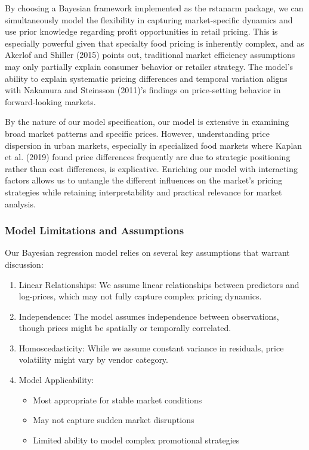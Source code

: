 \documentclass[
  letterpaper,
  DIV=11,
  numbers=noendperiod]{scrartcl}
\providecommand{\tightlist}{%
  \setlength{\itemsep}{0pt}\setlength{\parskip}{0pt}}\usepackage{longtable,booktabs,array}
\begin{document}
By choosing a Bayesian framework implemented as the rstanarm package, we
can simultaneously model the flexibility in capturing market-specific
dynamics and use prior knowledge regarding profit opportunities in
retail pricing. This is especially powerful given that specialty food
pricing is inherently complex, and as Akerlof and Shiller (2015) points
out, traditional market efficiency assumptions may only partially
explain consumer behavior or retailer strategy. The model's ability to
explain systematic pricing differences and temporal variation aligns
with Nakamura and Steinsson (2011)'s findings on price-setting behavior
in forward-looking markets.

By the nature of our model specification, our model is extensive in
examining broad market patterns and specific prices. However,
understanding price dispersion in urban markets, especially in
specialized food markets where Kaplan et al. (2019) found price
differences frequently are due to strategic positioning rather than cost
differences, is explicative. Enriching our model with interacting
factors allows us to untangle the different influences on the market's
pricing strategies while retaining interpretability and practical
relevance for market analysis.

\subsubsection{Model Limitations and
Assumptions}\label{model-limitations-and-assumptions}

Our Bayesian regression model relies on several key assumptions that
warrant discussion:

\begin{enumerate}
\def\labelenumi{\arabic{enumi}.}
\item
  Linear Relationships: We assume linear relationships between
  predictors and log-prices, which may not fully capture complex pricing
  dynamics.
\item
  Independence: The model assumes independence between observations,
  though prices might be spatially or temporally correlated.
\item
  Homoscedasticity: While we assume constant variance in residuals,
  price volatility might vary by vendor category.
\item
  Model Applicability:

  \begin{itemize}
  \tightlist
  \item
    Most appropriate for stable market conditions
  \item
    May not capture sudden market disruptions
  \item
    Limited ability to model complex promotional strategies
  \end{itemize}
\end{enumerate}
\end{document}
